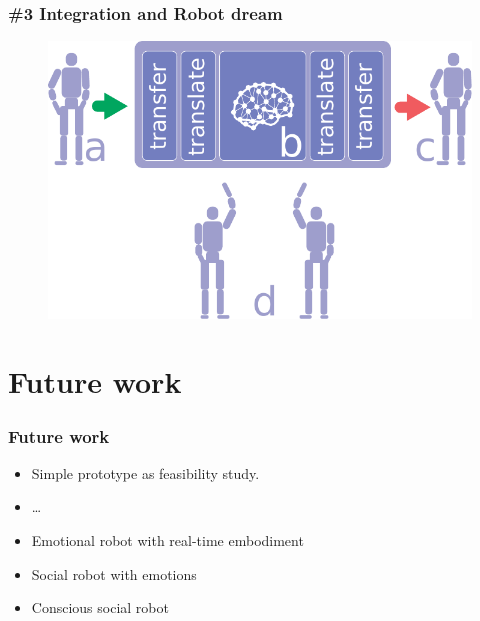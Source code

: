 \documentclass[12pt, aspectratio=169]{beamer}
\begin{document}
\begin{frame}
\frametitle{\#3 Integration and Robot dream}
\begin{figure}
\includegraphics[width=0.8\linewidth]{robot-dream}
\end{figure}
\end{frame}

\section{Future work}

\begin{frame}
  \frametitle{Future work}
  
\begin{itemize}
  \item Simple prototype as feasibility study.
  \item \ldots\
  \item Emotional robot with real-time embodiment
  \item Social robot with emotions
  \item Conscious social robot
\end{itemize}

\end{frame}

\end{document}
